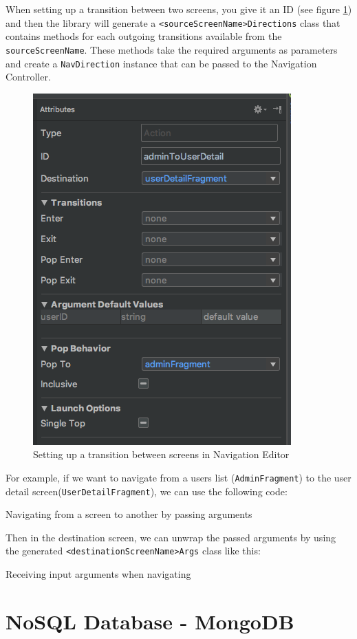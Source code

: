 \documentclass[11pt,a4paper]{report}
\newenvironment{code}{\captionsetup{type=listing}}{}
\begin{document}
When setting up a transition between two screens, you give it an ID (see figure \ref{transition_nav}) and then the library will generate a \verb+<sourceScreenName>Directions+ class that contains methods for each outgoing transitions available from the \verb+sourceScreenName+. These methods take the required arguments as parameters and create a \verb+NavDirection+ instance that can be passed to the Navigation Controller.
\begin{figure}[H]
\begin{center}
	\includegraphics[width=.5\textwidth]{assets/transition_nav}
	\caption[Transition between screens]{Setting up a transition between screens in Navigation Editor}
	\label{transition_nav}
\end{center}
\end{figure}

For example, if we want to navigate from a users list (\verb+AdminFragment+) to the user detail screen(\verb+UserDetailFragment+), we can use the following code:
\begin{code}
	\caption{Navigating from a screen to another by passing arguments}
\end{code}

Then in the destination screen, we can unwrap the passed arguments by using the generated \verb+<destinationScreenName>Args+ class like this:
\begin{code}
	\caption{Receiving input arguments when navigating}
\end{code}

\section{NoSQL Database - MongoDB}
\end{document}
